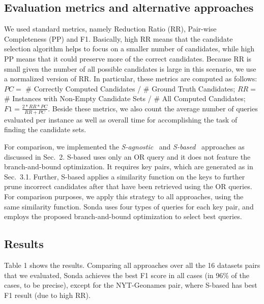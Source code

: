 \subsection{Evaluation metrics and alternative approaches} 
We used standard metrics, namely Reduction Ratio (RR), Pair-wise Completeness (PP) and F1. Basically, high RR means that the candidate selection algorithm helps to focus on a smaller number of candidates, while high PP means that it could preserve more of the correct candidates. Because RR is small given the number of all possible candidates is large in this scenario, we use a normalized version of RR. In particular, these metrics are computed as follows: $PC =$ \# Correctly Computed Candidates / \# Ground Truth Candidates; $RR =$ \# Instances with Non-Empty Candidate Sets / \# All Computed Candidates; $F1 = \frac{2 * RR * PC}{ RR + PC}$. Beside these metrics, we also count the average number of queries evaluated per instance as well as overall time for accomplishing the task of finding the candidate sets. 


For comparison, we implemented the \emph{S-agnostic}~\cite{papadakis_efficient_2011} and \emph{S-based}~\cite{DBLP:conf/semweb/SongH11} approaches as discussed in Sec.~2. S-based uses only an OR query and it does not feature the branch-and-bound optimization. It requires key pairs, which are generated as in Sec.~3.1. Further, S-based applies a similarity function on the keys to further prune incorrect candidates after that have been retrieved using the OR queries. For comparison purposes, we apply this strategy to all approaches, using the same similarity function. Sonda uses four types of queries for each key pair, and employs the proposed branch-and-bound optimization to select best queries. 

\subsection{Results} 
Table 1 shows the results. Comparing all approaches over all the 16 datasets pairs that we evaluated, Sonda achieves the best F1 score in all cases (in 96\% of the cases, to be precise), except for the NYT-Geonames pair, where S-based has best F1 result (due to high RR). 
 
